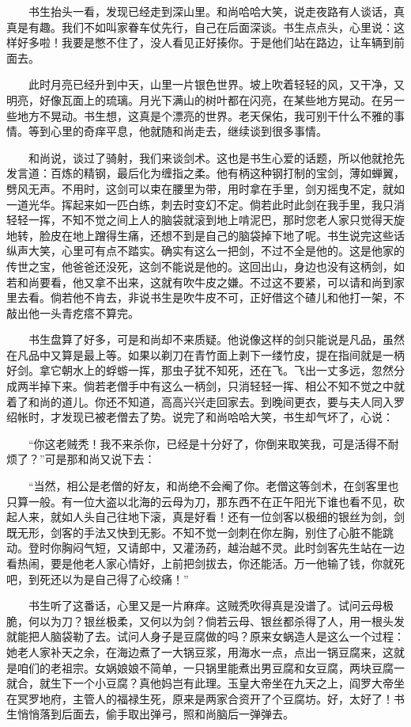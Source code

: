 　　书生抬头一看，发现已经走到深山里。和尚哈哈大笑，说走夜路有人谈话，真真是有趣。我们不如叫家眷车仗先行，自己在后面深谈。书生点点头，心里说：这样好多啦！我要是憋不住了，没人看见正好揍你。于是他们站在路边，让车辆到前面去。 

　　此时月亮已经升到中天，山里一片银色世界。坡上吹着轻轻的风，又干净，又明亮，好像瓦面上的琉璃。月光下满山的树叶都在闪亮，在某些地方晃动。在另一些地方不晃动。书生想，这真是个漂亮的世界。老天保佑，我可别干什么不雅的事情。等到心里的奇痒平息，他就随和尚走去，继续谈到很多事情。 

　　和尚说，谈过了骑射，我们来谈剑术。这也是书生心爱的话题，所以他就抢先发言道：百炼的精钢，最后化为缠指之柔。他有柄这种钢打制的宝剑，薄如蝉翼，劈风无声。不用时，这剑可以束在腰里为带，用时拿在手里，剑刃摇曳不定，就如一道光华。挥起来如一匹白练，刺去时变幻不定。倘若此时此剑在我手里，我只消轻轻一挥，不知不觉之间上人的脑袋就滚到地上啃泥巴，那时您老人家只觉得天旋地转，脸皮在地上蹭得生痛，还想不到是自己的脑袋掉下地了呢。书生说完这些话纵声大笑，心里可有点不踏实。确实有这么一把剑，不过不全是他的。这是他家的传世之宝，他爸爸还没死，这剑不能说是他的。这回出山，身边也没有这柄剑，如若和尚要看，他又拿不出来，这就有吹牛皮之嫌。不过这不要紧，可以请和尚到家里去看。倘若他不肯去，非说书生是吹牛皮不可，正好借这个碴儿和他打一架，不敲出他一头青疙瘩不算完。 

　　书生盘算了好多，可是和尚却不来质疑。他说像这样的剑只能说是凡品，虽然在凡品中又算是最上等。如果以剃刀在青竹面上剥下一缕竹皮，提在指间就是一柄好剑。拿它朝水上的蜉蝣一挥，那虫子犹不知死，还在飞。飞出一丈多远，忽然分成两半掉下来。倘若老僧手中有这么一柄剑，只消轻轻一挥、相公不知不觉之中就着了和尚的道儿。你还不知道，高高兴兴走回家去。到晚间更衣，要与夫人同入罗绍帐时，才发现已被老僧去了势。说完了和尚哈哈大笑，书生却气坏了，心说： 

　　“你这老贼秃！我不来杀你，已经是十分好了，你倒来取笑我，可是活得不耐烦了？”可是那和尚又说下去： 

　　“当然，相公是老僧的好友，和尚绝不会阉了你。老僧这等剑术，在剑客里也只算一般。有一位大盗以北海的云母为刀，那东西不在正午阳光下谁也看不见，砍起人来，就如人头自己往地下滚，真是好看！还有一位剑客以极细的银丝为剑，剑既无形，剑客的手法又快到无影。不知不觉一剑刺在你左胸，别住了心脏不能跳动。登时你胸闷气短，又请郎中，又灌汤药，越治越不灵。此时剑客先生站在一边看热闹，要是他老人家心情好，上前把剑拔去，你还能活。万一他输了钱，你就死吧，到死还以为是自己得了心绞痛！” 

　　书生听了这番话，心里又是一片麻痒。这贼秃吹得真是没谱了。试问云母极脆，何以为刀？银丝极柔，又何以为剑？倘若云母、银丝都杀得了人，用一根头发就能把人脑袋勒了去。试问人身子是豆腐做的吗？原来女蜗造人是这么一个过程：她老人家补天之余，在海边煮了一大锅豆浆，用海水一点，点出一锅豆腐来，这就是咱们的老祖宗。女娲娘娘不简单，一只锅里能煮出男豆腐和女豆腐，两块豆腐一就合，就生下一个小豆腐？真他妈岂有此理。玉皇大帝坐在九天之上，阎罗大帝坐在冥罗地府，主管人的福禄生死，原来是两家合资开了个豆腐坊。好，太好了！书生悄悄落到后面去，偷手取出弹弓，照和尚脑后一弹弹去。 

